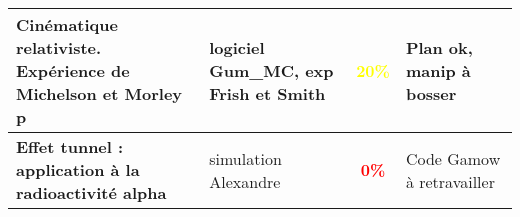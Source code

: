 \begin{changemargin}{-1.5cm}{-0cm}
\begin{center}
\begin{tabularx}{\paperwidth-2cm}{| X | X | c | X |}
  \hline
  \hline
  \textbf{Cinématique relativiste. Expérience de Michelson et Morley} p\pageref{LP_CinematiqueRelativiste} & logiciel Gum\_MC, exp Frish et Smith & \textcolor{yellow}{\textbf{20\%}} & Plan ok, manip à bosser  \\
  \hline
  \textbf{Effet tunnel : application à la radioactivité alpha} & simulation Alexandre & \textcolor{red}{\textbf{0\%}} & Code Gamow à retravailler  \\
  \hline
\end{tabularx}
\end{center}

\end{changemargin}